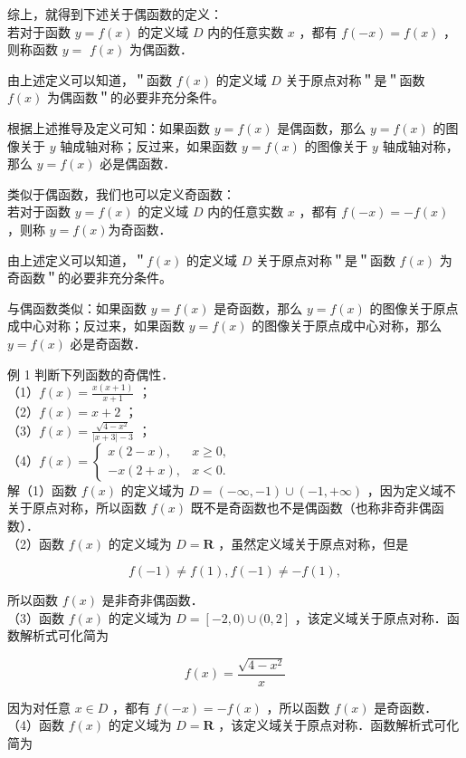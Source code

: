 \documentclass[10pt]{article}
\begin{document}
综上，就得到下述关于偶函数的定义：\\
若对于函数 \(y=f(x)\) 的定义域 \(D\) 内的任意实数 \(x\) ，都有 \(f(-x)=f(x)\) ，则称函数 \(y=\) \(f(x)\) 为偶函数．

由上述定义可以知道，＂函数 \(f(x)\) 的定义域 \(D\) 关于原点对称＂是＂函数 \(f(x)\) 为偶函数＂的必要非充分条件。

根据上述推导及定义可知：如果函数 \(y=f(x)\) 是偶函数，那么 \(y=f(x)\) 的图像关于 \(y\) 轴成轴对称；反过来，如果函数 \(y=f(x)\) 的图像关于 \(y\) 轴成轴对称，那么 \(y=f(x)\) 必是偶函数．

类似于偶函数，我们也可以定义奇函数：\\
若对于函数 \(y=f(x)\) 的定义域 \(D\) 内的任意实数 \(x\) ，都有 \(f(-x)=-f(x)\) ，则称 \(y=f(x)\)为奇函数．

由上述定义可以知道，＂\(f(x)\) 的定义域 \(D\) 关于原点对称＂是＂函数 \(f(x)\) 为奇函数＂的必要非充分条件。

与偶函数类似：如果函数 \(y=f(x)\) 是奇函数，那么 \(y=f(x)\) 的图像关于原点成中心对称；反过来，如果函数 \(y=f(x)\) 的图像关于原点成中心对称，那么 \(y=f(x)\) 必是奇函数．

例 1 判断下列函数的奇偶性．\\
（1）\(f(x)=\frac{x(x+1)}{x+1}\) ；\\
（2）\(f(x)=x+2\) ；\\
（3）\(f(x)=\frac{\sqrt{4-x^{2}}}{|x+3|-3}\) ；\\
（4）\(f(x)= \begin{cases}x(2-x), & x \geqslant 0, \\ -x(2+x), & x<0 .\end{cases}\)\\
解（1）函数 \(f(x)\) 的定义域为 \(D=(-\infty,-1) \cup(-1,+\infty)\) ，因为定义域不关于原点对称，所以函数 \(f(x)\) 既不是奇函数也不是偶函数（也称非奇非偶函数）．\\
（2）函数 \(f(x)\) 的定义域为 \(D=\mathbf{R}\) ，虽然定义域关于原点对称，但是

\[
f(-1) \neq f(1), f(-1) \neq-f(1),
\]

所以函数 \(f(x)\) 是非奇非偶函数．\\
（3）函数 \(f(x)\) 的定义域为 \(D=[-2,0) \cup(0,2]\) ，该定义域关于原点对称．函数解析式可化简为

\[
f(x)=\frac{\sqrt{4-x^{2}}}{x}
\]

因为对任意 \(x \in D\) ，都有 \(f(-x)=-f(x)\) ，所以函数 \(f(x)\) 是奇函数．\\
（4）函数 \(f(x)\) 的定义域为 \(D=\mathbf{R}\) ，该定义域关于原点对称．函数解析式可化简为
\end{document}
